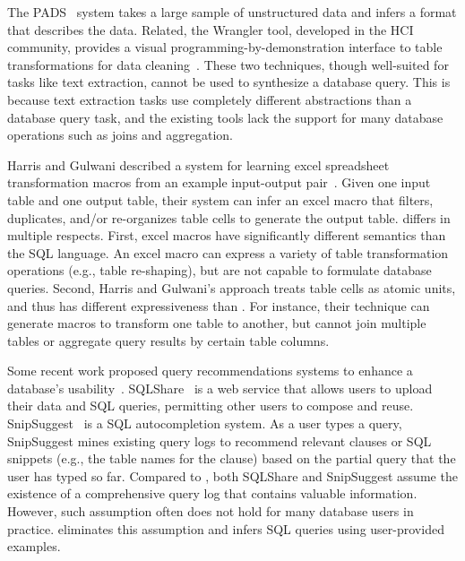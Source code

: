 The PADS~\cite{Fisher:2008} system takes a large sample
of unstructured data and infers a
format that describes the data. Related,
the Wrangler tool, developed in the HCI community,
provides a visual programming-by-demonstration
interface to table transformations for data cleaning~\cite{Kandel:2011}.
These two techniques, though well-suited for tasks
like text extraction, cannot be used to 
synthesize a database query.
This is because text extraction tasks
use completely different abstractions than a database query task,
and the existing tools lack the support for many database operations
such as joins and aggregation.




Harris and Gulwani described a system for learning excel
spreadsheet transformation macros from an example
input-output pair~\cite{Harris:2011}. Given one input table and one output
table, their system can infer an excel macro that filters,
duplicates, and/or re-organizes table cells to generate the output table.
\ourtool differs in multiple respects.
First, excel macros have significantly different
semantics than the SQL language.
An excel macro can express a variety of table transformation operations
(e.g., table re-shaping), but are not capable to formulate database queries.
Second, Harris and Gulwani's approach treats table cells
as atomic units, and thus has different expressiveness
than \ourtool. For instance, their technique can generate macros to
transform one table to another, but cannot join multiple
tables or aggregate query results by certain table columns. 




Some recent work proposed query recommendations systems
to enhance a database's usability~\cite{Howe:2011, Khoussainova:2010}. 
SQLShare~\cite{Howe:2011} is a web service that allows
users to upload their data and SQL queries,
permitting other users
to compose and reuse. SnipSuggest~\cite{Khoussainova:2010} is a SQL autocompletion
system. As a user types a query, SnipSuggest mines existing query
logs to recommend relevant clauses or SQL snippets (e.g., the table
names for the  clause) based on the partial query that
the user has typed so far.
Compared to \ourtool, both SQLShare and SnipSuggest assume the
existence of a comprehensive query log
that contains valuable information.
However, such assumption often does not hold for
many database users in practice.
\ourtool eliminates this assumption and infers 
SQL queries using user-provided examples.


